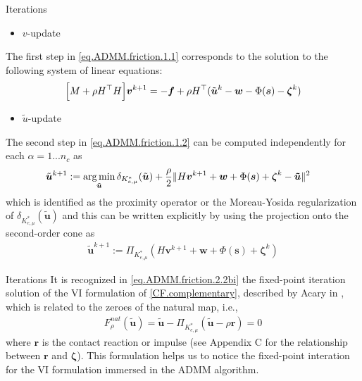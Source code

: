 \documentclass[8pt,red]{beamer}
\theoremstyle{plain}
\theoremstyle{definition}
\theoremstyle{remark}
\newcommand{\argmin}{\operatornamewithlimits{\mathrm{arg\,min}}}
\newcommand{\bi}[1]{\ensuremath{\boldsymbol{#1}}}
\begin{document}
\begin{frame}{Iterations}

\begin{itemize}
\item $v$-update
\end{itemize}
The first step in \eqref{eq.ADMM.friction.1.1} corresponds to the solution to the following system of linear equations: 
\begin{align}
  \Bigl[ M + 
  \rho H^{\top} H \Bigr] \bi{v}^{k+1} 
  = -\bi{f} 
  + \rho H^{\top} (\tilde{\bi{u}}^k - \bi{w} - \Phi(\bi{s}) - \bi{\zeta}^k)   \label{eq.ADMM.friction.2.1}
\end{align}

\begin{itemize}
\item $\tilde{u}$-update
\end{itemize}
The second step in \eqref{eq.ADMM.friction.1.2} can be computed independently for each $\alpha = 1 ... n_{c}$ as 
\begin{align}
  \tilde{\bi{u}}^{k+1}
  &:= \argmin_{\tilde{\bi{u}}} 
    \delta_{K_{e,\mu}^{*}}(\tilde{\bi{u}}) 
    + \frac{\rho}{2} 
    \| H \bi{v}^{k+1} + \bi{w} + \Phi(\bi{s}) + \bi{\zeta}^{k} - \bi{\tilde u} \|^{2}
  \label{eq.ADMM.friction.2.2}
\end{align}
which is identified as the proximity operator or the Moreau-Yosida regularization of $\delta_{K_{e,\mu}^{*}}(\tilde{\bi{u}})$ and this can be written explicitly by using the projection onto the second-order cone as
\begin{align}
  \tilde{\bi{u}}^{k+1} := \Pi_{K_{e,\mu}^{*}}(H \bi{v}^{k+1} + \bi{w} + \Phi(\bi{s}) + \bi{\zeta}^{k})
  \label{eq.ADMM.friction.2.2bi}
\end{align}

\end{frame}

\begin{frame}{Iterations}
It is recognized in \eqref{eq.ADMM.friction.2.2bi} the fixed-point iteration solution of the VI formulation of \eqref{CF.complementary}, described by Acary in \citep{acary:hal-01630836}, which is related to the zeroes of the natural map, i.e.,
\begin{align}
F_{\rho}^{nat}(\tilde{\bi{u}}) = \tilde{\bi{u}} - \Pi_{K_{e,\mu}^{*}}(\tilde{\bi{u}} - \rho \bi{r}) = 0 \label{eq.ADMM.naturalmap}
\end{align}
where $\bi{r}$ is the contact reaction or impulse (see Appendix C for the relationship between $\bi{r}$ and $\bi{\zeta}$). This formulation helps us to notice the fixed-point interation for the VI formulation immersed in the ADMM algorithm.

\end{frame}
\end{document}
